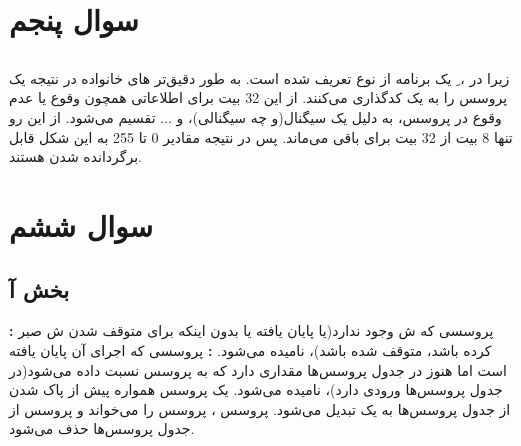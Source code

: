 \documentclass{article}
\begin{document}
\section{سوال پنجم}
\subsection{}
\lr{}
\subsection{}
زیرا در ، ِ یک برنامه از نوع  تعریف شده است. به طور دقیق‌تر های خانواده  در  نتیجه یک پروسس را به یک  کدگذاری می‌کنند. از این 32 بیت برای اطلاعاتی همچون وقوع یا عدم وقوع  در پروسس،  به دلیل یک سیگنال(و چه سیگنالی)، و $\ldots$ تقسیم می‌شود. از این رو تنها 8 بیت از 32 بیت برای  باقی می‌ماند. پس در نتیجه مقادیر 0 تا 255 به این شکل قابل برگردانده شدن هستند.
\subsection{}
\lr{}

\section{سوال ششم}
\subsection{بخش آ}
\textbf{:}
پروسسی که ش وجود ندارد(یا پایان یافته یا بدون اینکه برای متوقف شدن ش صبر کرده باشد، متوقف شده باشد)،  نامیده می‌شود.
\newline
\textbf{:}
پروسسی که اجرای آن پایان یافته است اما هنوز در جدول پروسس‌ها مقداری دارد که به پروسس  نسبت داده می‌شود(در جدول پروسس‌ها ورودی دارد)،  نامیده می‌شود. یک پروسس  همواره پیش از پاک شدن از جدول پروسس‌ها به یک  تبدیل می‌شود. پروسس ،  پروسس  را می‌خواند و پروسس  از جدول پروسس‌ها حذف می‌شود.
\end{document}
